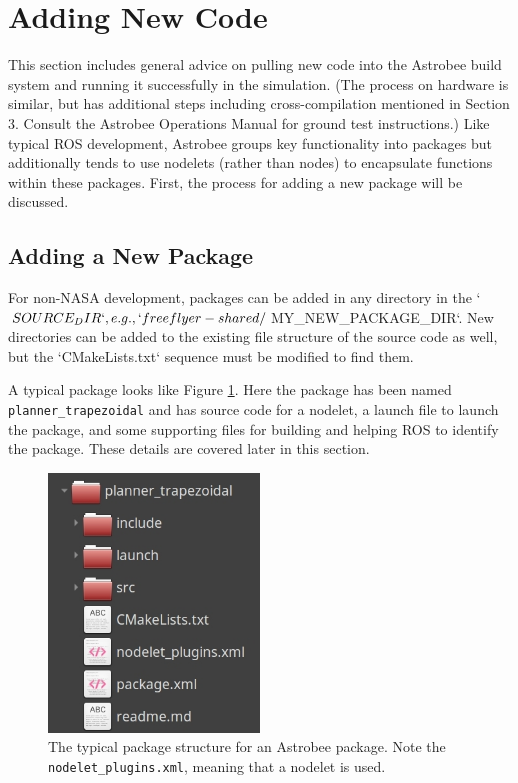 \documentclass{article}
\begin{document}
\clearpage
\section{Adding New Code}

This section includes general advice on pulling new code into the Astrobee build system and running it successfully in the simulation. (The process on hardware is similar, but has additional steps including cross-compilation mentioned in Section 3. Consult the Astrobee Operations Manual for ground test instructions.) Like typical ROS development, Astrobee groups key functionality into packages but additionally tends to use nodelets (rather than nodes) to encapsulate functions within these packages. First, the process for adding a new package will be discussed.

\subsection{Adding a New Package}
\begin{markdown}
For non-NASA development, packages can be added in any directory in the `$SOURCE_DIR`, e.g., `freeflyer-shared/$MY_NEW_PACKAGE_DIR`. New directories
can be added to the existing file structure of the source code as well, but the `CMakeLists.txt` sequence must be modified to find them. 
\end{markdown}

A typical package looks like Figure \ref{fig:package}. Here the package has been named \texttt{planner\_trapezoidal} and has source code for a nodelet, a launch file to launch the package, and some supporting files for building and helping ROS to identify the package. These details are covered later in this section.

\begin{figure}[hb!]
	\centering
	\includegraphics[width=0.5\textwidth]{img/sample_package.jpg}
	\caption{The typical package structure for an Astrobee package. Note the \texttt{nodelet\_plugins.xml}, meaning that a nodelet is used.}
	\label{fig:package}
\end{figure}
\vspace{1cm}
\end{document}
